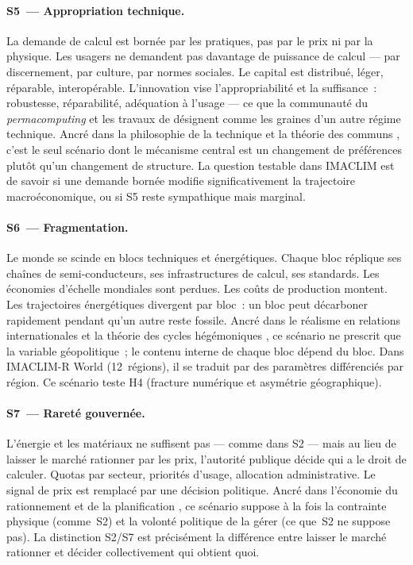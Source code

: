\paragraph{S5~--- Appropriation technique.}
La demande de calcul est born\'ee par les pratiques, pas par le prix ni par la physique. Les usagers ne demandent pas davantage de puissance de calcul --- par discernement, par culture, par normes sociales. Le capital est distribu\'e, l\'eger, r\'eparable, interop\'erable. L'innovation vise l'appropriabilit\'e et la suffisance~: robustesse, r\'eparabilit\'e, ad\'equation \`a l'usage --- ce que la communaut\'e du \emph{permacomputing} et les travaux de \textcite{deron_sprouting_2025} d\'esignent comme les \og graines\fg{} d'un autre r\'egime technique. Ancr\'e dans la philosophie de la technique \parencite{stiegler_technique_1994, illich_tools_1973} et la th\'eorie des communs \parencite{ostrom_governing_1990}, c'est le seul sc\'enario dont le m\'ecanisme central est un changement de pr\'ef\'erences plut\^ot qu'un changement de structure. La question testable dans IMACLIM est de savoir si une demande born\'ee modifie significativement la trajectoire macro\'economique, ou si S5 reste sympathique mais marginal.

\paragraph{S6~--- Fragmentation.}
Le monde se scinde en blocs techniques et \'energ\'etiques. Chaque bloc r\'eplique ses cha\^ines de semi-conducteurs, ses infrastructures de calcul, ses standards. Les \'economies d'\'echelle mondiales sont perdues. Les co\^uts de production montent. Les trajectoires \'energ\'etiques divergent par bloc~: un bloc peut d\'ecarboner rapidement pendant qu'un autre reste fossile. Ancr\'e dans le r\'ealisme en relations internationales et la th\'eorie des cycles h\'eg\'emoniques \parencite{arrighi_long_1994}, ce sc\'enario ne prescrit que la variable g\'eopolitique~; le contenu interne de chaque bloc d\'epend du bloc. Dans IMACLIM-R World (12~r\'egions), il se traduit par des param\`etres diff\'erenci\'es par r\'egion. Ce sc\'enario teste H4 (fracture num\'erique et asym\'etrie g\'eographique).

\paragraph{S7~--- Raret\'e gouvern\'ee.}
L'\'energie et les mat\'eriaux ne suffisent pas --- comme dans S2 --- mais au lieu de laisser le march\'e rationner par les prix, l'autorit\'e publique d\'ecide qui a le droit de calculer. Quotas par secteur, priorit\'es d'usage, allocation administrative. Le signal de prix est remplac\'e par une d\'ecision politique. Ancr\'e dans l'\'economie du rationnement et de la planification \parencite{pigou_political_1920}, ce sc\'enario suppose \`a la fois la contrainte physique (comme~S2) et la volont\'e politique de la g\'erer (ce que~S2 ne suppose pas). La distinction S2/S7 est pr\'ecis\'ement la diff\'erence entre laisser le march\'e rationner et d\'ecider collectivement qui obtient quoi.

